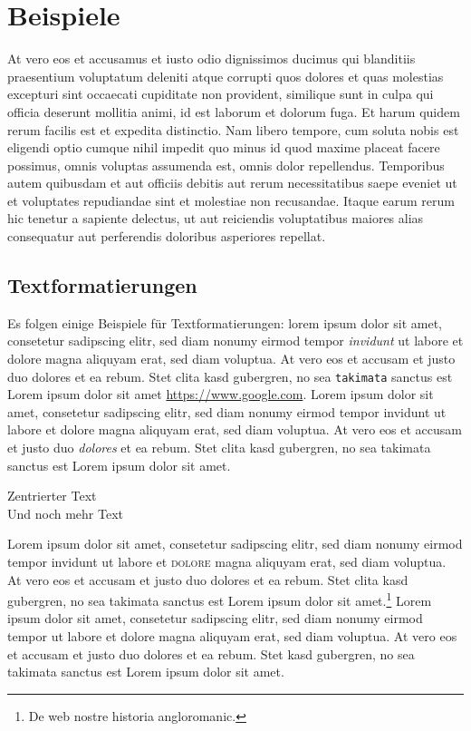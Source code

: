 \chapter{Beispiele}\label{ch:beispiele}
At vero eos et accusamus et iusto odio dignissimos ducimus qui blanditiis praesentium voluptatum deleniti atque corrupti quos dolores et quas molestias excepturi sint occaecati cupiditate non provident, similique sunt in culpa qui officia deserunt mollitia animi, id est laborum et dolorum fuga. Et harum quidem rerum facilis est et expedita distinctio. Nam libero tempore, cum soluta nobis est eligendi optio cumque nihil impedit quo minus id quod maxime placeat facere possimus, omnis voluptas assumenda est, omnis dolor repellendus. Temporibus autem quibusdam et aut officiis debitis aut rerum necessitatibus saepe eveniet ut et voluptates repudiandae sint et molestiae non recusandae. Itaque earum rerum hic tenetur a sapiente delectus, ut aut reiciendis voluptatibus maiores alias consequatur aut perferendis doloribus asperiores repellat.

\section{Textformatierungen}\label{sec:textformatierungen}

Es folgen einige Beispiele für Textformatierungen: lorem ipsum dolor sit amet, consetetur sadipscing elitr, sed diam nonumy eirmod tempor \emph{invidunt} ut labore et dolore magna aliquyam erat, sed diam voluptua. At vero eos et accusam et justo duo dolores et ea rebum. Stet clita kasd gubergren, no sea \texttt{takimata} sanctus est Lorem ipsum dolor sit amet \url{https://www.google.com}. Lorem ipsum dolor sit amet, consetetur sadipscing elitr, sed diam nonumy eirmod tempor invidunt ut labore et dolore magna aliquyam erat, sed diam voluptua. At vero eos et accusam et justo duo \textit{dolores} et ea rebum. Stet clita kasd gubergren, no sea takimata sanctus est Lorem ipsum dolor sit amet.

\begin{center}
Zentrierter Text \\
Und noch mehr Text \\
\end{center}

Lorem ipsum dolor sit amet, consetetur sadipscing elitr, sed diam nonumy eirmod tempor invidunt ut labore et \textsc{dolore} magna aliquyam erat, sed diam voluptua. At vero eos et accusam et justo duo dolores et ea rebum. Stet clita kasd gubergren, no sea takimata sanctus est Lorem ipsum dolor sit amet.\footnote{De web nostre historia angloromanic.} Lorem ipsum dolor sit amet, consetetur sadipscing elitr, sed diam nonumy eirmod tempor  ut labore et dolore magna aliquyam erat, sed diam voluptua. At vero eos et accusam et justo duo dolores et ea rebum. Stet  kasd gubergren, no sea takimata sanctus est Lorem ipsum dolor sit amet.

